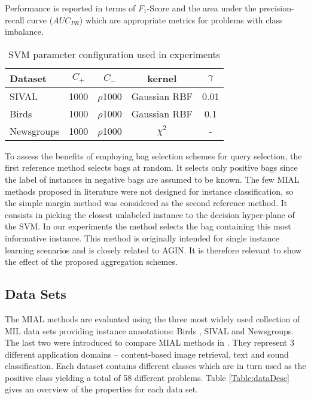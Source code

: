 \documentclass{article}
\begin{document}
Performance is reported in terms of $F_1$-Score and the area under the precision-recall curve ($AUC_{PR}$) which are appropriate metrics for problems with class imbalance. 




\begin{table}[!ht]
\small
\centering
\caption{SVM parameter configuration used in experiments} 
\begin{tabular}{lcccc}
\toprule

\textbf{Dataset}& $C_+$& $C_-$ & kernel & 
$\gamma$ \\

\midrule
SIVAL 		& 1000 & $\rho$1000&Gaussian RBF & 0.01 \\
Birds 		& 1000 & $\rho$1000&Gaussian RBF & 0.1 \\
Newsgroups 	& 1000 & $\rho$1000& $\chi^2$ & - \\
\bottomrule
\end{tabular}
\label{Table:SVMParameters}
\end{table}





To assess the benefits of employing bag selection schemes for query selection, the first reference method selects bags at random. It selects only positive bags since the label of instances in negative bags are assumed to be known. The few MIAL methods proposed in literature were not designed for instance classification, so the simple margin method \cite{Tong2001} was considered as the second reference method. It consists in picking the closest unlabeled instance to the decision hyper-plane of the SVM. In our experiments the method selects the bag containing this most informative instance. This method is originally intended for single instance learning scenarios and is closely related to AGIN. It is therefore relevant to show the effect of the proposed aggregation schemes.    


\subsection{Data Sets}
The MIAL methods are evaluated using the three most widely used collection of MIL data sets providing instance annotations: Birds \cite{Briggs2012}, SIVAL and Newsgroups. The last two were introduced to compare MIAL methods in \cite{Settles2008}. They represent 3 different application domains -- content-based image retrieval, text and sound classification. Each dataset contains different classes which are in turn used as the positive class yielding a total of 58 different problems. Table \ref{Table:dataDesc} gives an overview of the properties for each data set. 
\end{document}
